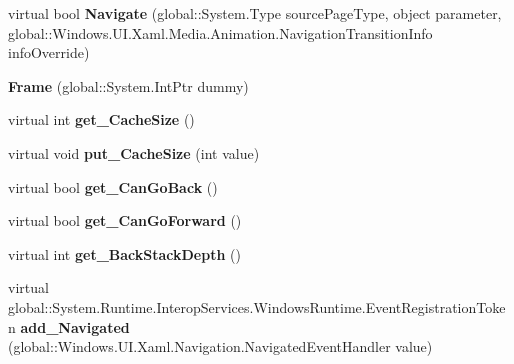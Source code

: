 \begin{DoxyCompactItemize}
\item 
\mbox{\label{class_windows_1_1_u_i_1_1_xaml_1_1_controls_1_1_frame_ad618ba9d883d20cb4fe2b759803359e9}} 
virtual bool {\bfseries Navigate} (global\+::\+System.\+Type source\+Page\+Type, object parameter, global\+::\+Windows.\+U\+I.\+Xaml.\+Media.\+Animation.\+Navigation\+Transition\+Info info\+Override)
\item 
\mbox{\label{class_windows_1_1_u_i_1_1_xaml_1_1_controls_1_1_frame_a84fab9df3b200274d2539149011dfb10}} 
{\bfseries Frame} (global\+::\+System.\+Int\+Ptr dummy)
\item 
\mbox{\label{class_windows_1_1_u_i_1_1_xaml_1_1_controls_1_1_frame_a4feacaac243c53e320ffcf6ceba4a5e7}} 
virtual int {\bfseries get\+\_\+\+Cache\+Size} ()
\item 
\mbox{\label{class_windows_1_1_u_i_1_1_xaml_1_1_controls_1_1_frame_af1e1e012518d0402becbf9239646174d}} 
virtual void {\bfseries put\+\_\+\+Cache\+Size} (int value)
\item 
\mbox{\label{class_windows_1_1_u_i_1_1_xaml_1_1_controls_1_1_frame_ab2b52e19abf5dd97c35d8e4da92c57db}} 
virtual bool {\bfseries get\+\_\+\+Can\+Go\+Back} ()
\item 
\mbox{\label{class_windows_1_1_u_i_1_1_xaml_1_1_controls_1_1_frame_a85c6c5e01ec4c931d0b6f7752ea62bc4}} 
virtual bool {\bfseries get\+\_\+\+Can\+Go\+Forward} ()
\item 
\mbox{\label{class_windows_1_1_u_i_1_1_xaml_1_1_controls_1_1_frame_ac2a0cbed74e7e3a18163cbcb7a34def2}} 
virtual int {\bfseries get\+\_\+\+Back\+Stack\+Depth} ()
\item 
\mbox{\label{class_windows_1_1_u_i_1_1_xaml_1_1_controls_1_1_frame_a38b94e8bce03524a1c9b3c012074a6e8}} 
virtual global\+::\+System.\+Runtime.\+Interop\+Services.\+Windows\+Runtime.\+Event\+Registration\+Token {\bfseries add\+\_\+\+Navigated} (global\+::\+Windows.\+U\+I.\+Xaml.\+Navigation.\+Navigated\+Event\+Handler value)

\end{DoxyCompactItemize}
